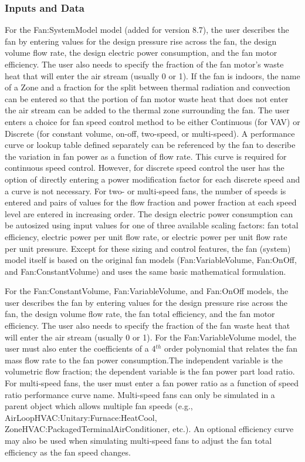 \subsubsection{Inputs and Data}\label{inputs-and-data-000}
For the Fan:SystemModel model (added for version 8.7), the user describes the fan by entering values for the design pressure rise across the fan, the design volume flow rate, the design electric power consumption, and the fan motor efficiency. The user also needs to specify the fraction of the fan motor's waste heat that will enter the air stream (usually 0 or 1). If the fan is indoors, the name of a Zone and a fraction for the split between thermal radiation and convection can be entered so that the portion of fan motor waste heat that does not enter the air stream can be added to the thermal zone surrounding the fan. The user enters a choice for fan speed control method to be either Continuous (for VAV) or Discrete (for constant volume, on-off, two-speed, or multi-speed).  A performance curve or lookup table defined separately can be referenced by the fan to describe the variation in fan power as a function of flow rate. This curve is required for continuous speed control. However, for discrete speed control the user has the option of directly entering a power modification factor for each discrete speed and a curve is not necessary. For two- or multi-speed fans, the number of speeds is entered and pairs of values for the flow fraction and power fraction at each speed level are entered in increasing order. The design electric power consumption can be autosized using input values for one of three available scaling factors: fan total efficiency, electric power per unit flow rate, or electric power per unit flow rate per unit pressure.  Except for these sizing and control features, the fan (system) model itself is based on the original fan models (Fan:VariableVolume, Fan:OnOff, and Fan:ConstantVolume) and uses the same basic mathematical formulation.

For the Fan:ConstantVolume, Fan:VariableVolume, and Fan:OnOff models, the user describes the fan by entering values for the design pressure rise across the fan, the design volume flow rate, the fan total efficiency, and the fan motor efficiency. The user also needs to specify the fraction of the fan waste heat that will enter the air stream (usually 0 or 1). For the Fan:VariableVolume model, the user must also enter the coefficients of a 4\(^{th}\) order polynomial that relates the fan mass flow rate to the fan power consumption.The independent variable is the volumetric flow fraction; the dependent variable is the fan power part load ratio. For multi-speed fans, the user must enter a fan power ratio as a function of speed ratio performance curve name. Multi-speed fans can only be simulated in a parent object which allows multiple fan speeds (e.g., AirLoopHVAC:Unitary:Furnace:HeatCool, ZoneHVAC:PackagedTerminalAirConditioner, etc.). An optional efficiency curve may also be used when simulating multi-speed fans to adjust the fan total efficiency as the fan speed changes.

